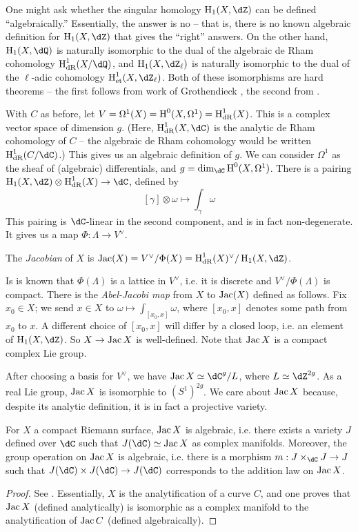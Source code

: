 One might ask whether the singular homology $\h_1(X,\dZ)$ can be 
defined ``algebraically.'' Essentially, the answer is no -- that is, there is 
no known algebraic definition for $\h_1(X,\dZ)$ that gives the 
``right'' answers. On the other hand, $\h_1(X,\dQ)$ is naturally 
isomorphic to the dual of the algebraic de Rham cohomology 
$\h_\text{dR}^1(X/\dQ)$, and $\h_1(X,\dZ_\ell)$ is naturally 
isomorphic to the dual of the $\ell$-adic cohomology 
$\h_\text{et}^1(X,\dZ_\ell)$. Both of these isomorphisms are hard 
theorems -- the first follows from work of Grothendieck \cite{gr66}, the 
second from \cite[I 4.6.3]{de77}. 

With $C$ as before, let $V=\Omega^1(X)=\operatorname{H}^0(X,\Omega^1)=\operatorname{H}^1_\text{dR}(X)$. 
This is a complex vector space of dimension $g$. (Here, $\h_\text{dR}^1(X,\dC)$ 
is the analytic de Rham cohomology of $C$ -- the algebraic de Rham cohomology 
would be written $\h_\text{dR}^1(C/\dC)$.) This gives us an algebraic 
definition of $g$. We can consider $\Omega^1$ as the sheaf of (algebraic) 
differentials, and $g=\dim_\dC\h^0(X,\Omega^1)$. There is a pairing 
$\h_1(X,\dZ)\otimes\h_\text{dR}^1(X)\to\dC$, defined by 
\[
  [\gamma]\otimes \omega \mapsto \int_\gamma \omega
\]
This pairing is $\dC$-linear in the second component, and is in fact 
non-degenerate. It gives us a map $\Phi:\Lambda\to V^\vee$. 

\begin{definition}[analytic]
The \emph{Jacobian} of $X$ is 
$\jac(X)=V^\vee/\Phi(X) = \h_\textnormal{dR}^1(X)^\vee/\h_1(X,\dZ)$. 
\end{definition}

Is is known that $\Phi(\Lambda)$ is a lattice in $V^\vee$, i.e. it is discrete 
and $V^\vee/\Phi(\Lambda)$ is compact. There is the \emph{Abel-Jacobi map} from 
$X$ to $\operatorname{Jac}(X)$ defined as follows. Fix $x_0\in X$; we send $x\in X$ to 
$\omega\mapsto \int_{[x_0,x]} \omega$, where $[x_0,x]$ denotes some path from 
$x_0$ to $x$. A different choice of $[x_0,x]$ will differ by a closed loop, 
i.e. an element of $\h_1(X,\dZ)$. So $X\to\operatorname{Jac} X$ is well-defined. Note 
that $\operatorname{Jac} X$ is a compact complex Lie group. 

After choosing a basis for $V^\vee$, we have $\jac X\simeq \dC^g/L$, where 
$L\simeq \dZ^{2 g}$. As a real Lie group, $\operatorname{Jac} X$ is isomorphic to 
$(S^1)^{2 g}$. 
We care about $\operatorname{Jac} X$ because, despite its analytic definition, it is in fact 
a projective variety.

\begin{theorem}
For $X$ a compact Riemann surface, $\operatorname{Jac} X$ is algebraic, i.e. there exists a 
variety $J$ defined over $\dC$ such that $J(\dC)\simeq\jac X$ as 
complex manifolds. Moreover, the group operation on $\operatorname{Jac} X$ is algebraic, 
i.e. there is a morphism $m:J\times_\dC J\to J$ such that 
$J(\dC)\times J(\dC)\to J(\dC)$ corresponds to the 
addition law on $\operatorname{Jac} X$. 
\end{theorem}
\begin{proof}
See \cite[I.18]{mi-av}. Essentially, $X$ is the analytification of a curve $C$, 
and one proves that $\operatorname{Jac} X$ (defined analytically) is isomorphic as a complex 
manifold to the analytification of $\operatorname{Jac} C$ (defined algebraically). 
\end{proof}

